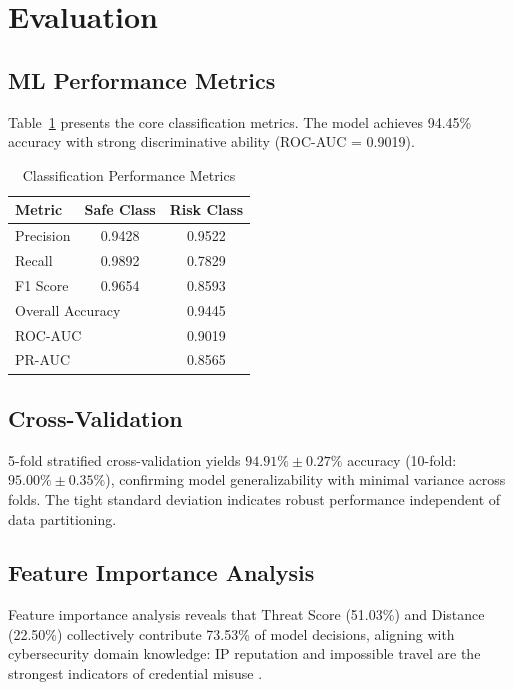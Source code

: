 \documentclass[conference]{IEEEtran}
\begin{document}
\section{Evaluation}

\subsection{ML Performance Metrics}

Table~\ref{tab:metrics} presents the core classification metrics. The model achieves 94.45\% accuracy with strong discriminative ability (ROC-AUC = 0.9019).

\begin{table}[h]
\centering
\caption{Classification Performance Metrics}
\label{tab:metrics}
\begin{tabular}{@{}lcc@{}}
\toprule
Metric & Safe Class & Risk Class \\
\midrule
Precision & 0.9428 & 0.9522 \\
Recall & 0.9892 & 0.7829 \\
F1 Score & 0.9654 & 0.8593 \\
\midrule
\multicolumn{2}{l}{Overall Accuracy} & 0.9445 \\
\multicolumn{2}{l}{ROC-AUC} & 0.9019 \\
\multicolumn{2}{l}{PR-AUC} & 0.8565 \\
\bottomrule
\end{tabular}
\end{table}

\subsection{Cross-Validation}

5-fold stratified cross-validation yields $94.91\% \pm 0.27\%$ accuracy (10-fold: $95.00\% \pm 0.35\%$), confirming model generalizability with minimal variance across folds. The tight standard deviation indicates robust performance independent of data partitioning.

\subsection{Feature Importance Analysis}

Feature importance analysis reveals that Threat Score (51.03\%) and Distance (22.50\%) collectively contribute 73.53\% of model decisions, aligning with cybersecurity domain knowledge: IP reputation and impossible travel are the strongest indicators of credential misuse \cite{freeman2016}.
\end{document}

